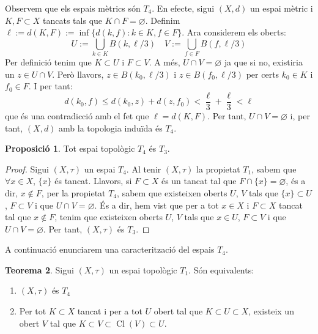 \documentclass[10pt,a4paper]{article}
\theoremstyle{definition}
\newtheorem{theorem}{Teorema}[section]
\newtheorem{prop}[theorem]{Proposició}
\DeclareMathOperator{\Cl}{Cl} %
\begin{document}
Observem que els espais mètrics són $T_4$. En efecte, sigui $(X,d)$ un espai mètric i $K,F\subset X$ tancats tals que $K\cap F=\varnothing$. Definim $\ell:=d(K,F):=\inf\{d(k,f):k\in K,f\in F\}$. Ara considerem els oberts: $$U:=\bigcup_{k\in K}B(k,\ell/3)\quad V:=\bigcup_{f\in F}B(f,\ell/3)$$
Per definició tenim que $K\subset U$ i $F\subset V$. A més, $U\cap V=\varnothing$ ja que si no, existiria un $z\in U\cap V$. Però llavors, $z\in B(k_0,\ell/3)$ i $z\in B(f_0,\ell/3)$ per certs $k_0\in K$ i $f_0\in F$. I per tant: $$d(k_0,f)\leq d(k_0,z)+d(z,f_0)<\frac{\ell}{3}+\frac{\ell}{3}<\ell$$
que és una contradicció amb el fet que $\ell=d(K,F)$. Per tant, $U\cap V=\varnothing$ i, per tant, $(X,d)$ amb la topologia induïda és $T_4$.
\begin{prop}
      Tot espai topològic $T_4$ és $T_3$.
\end{prop}
\begin{proof}
      Sigui $(X,\tau)$ un espai $T_4$. Al tenir $(X,\tau)$ la propietat $T_1$, sabem que $\forall x\in X$, $\{x\}$ és tancat. Llavors, si $F\subset X$ és un tancat tal que $F\cap\{x\}=\varnothing$, és a dir, $x\notin F$, per la propietat $T_4$, sabem que existeixen oberts $U$, $V$ tals que $\{x\}\subset U$, $F\subset V$ i que $U\cap V=\varnothing$. És a dir, hem vist que per a tot $x\in X$ i $F\subset X$ tancat tal que $x\notin F$, tenim que existeixen oberts $U$, $V$ tals que $x\in U$, $F\subset V$ i que $U\cap V=\varnothing$. Per tant, $(X,\tau)$ és $T_3$.
\end{proof}
A continuació enunciarem una caracterització del espais $T_4$.
\begin{theorem}
      Sigui $(X,\tau)$ un espai topològic $T_1$. Són equivalents:
      \begin{enumerate}
            \item\label{t4_1} $(X,\tau)$ és $T_4$
            \item\label{t4_2} Per tot $K\subset X$ tancat i per a tot $U$ obert tal que $K\subset U \subset X$, existeix un obert $V$ tal que $K\subset V \subset \Cl(V) \subset U$.
      \end{enumerate}
\end{theorem}
\end{document}
